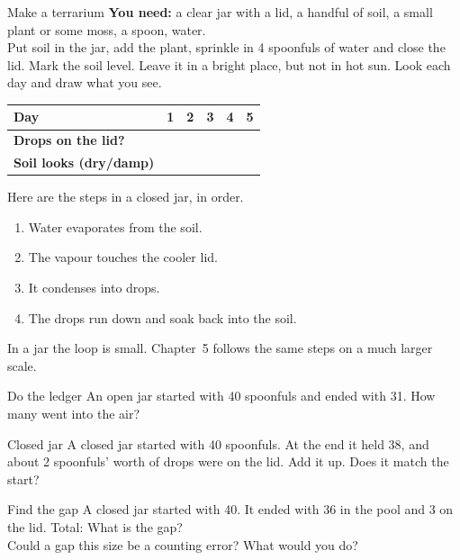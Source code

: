 \begin{tryit}{Make a terrarium}
\textbf{You need:} a clear jar with a lid, a handful of soil, a small plant or some moss, a spoon, water.\\
Put soil in the jar, add the plant, sprinkle in 4 spoonfuls of water and close the lid. Mark the soil level. Leave it in a bright place, but not in hot sun. Look each day and draw what you see.\par\medskip
\renewcommand{\arraystretch}{1.6}
\begin{tabular}{|l|c|c|c|c|c|}
\hline
\textbf{Day} & 1 & 2 & 3 & 4 & 5\\ \hline
\textbf{Drops on the lid?} & & & & & \\ \hline
\textbf{Soil looks (dry/damp)} & & & & & \\ \hline
\end{tabular}
\end{tryit}

Here are the steps in a closed jar, in order.
\begin{enumerate}[leftmargin=1.6em,itemsep=0.2em]
\item Water evaporates from the soil.
\item The vapour touches the cooler lid.
\item It condenses into drops.
\item The drops run down and soak back into the soil.
\end{enumerate}
In a jar the loop is small. Chapter~5 follows the same steps on a much larger scale.

\clearpage

\begin{puzzle}{Do the ledger}
An open jar started with 40 spoonfuls and ended with 31. How many went into the air? \wline[1.6cm]
\end{puzzle}

\begin{puzzle}{Closed jar}
A closed jar started with 40 spoonfuls. At the end it held 38, and about 2 spoonfuls' worth of drops were on the lid. Add it up. \wline[1.6cm] Does it match the start? \wline[2cm]
\end{puzzle}

\begin{puzzle}{Find the gap}
A closed jar started with 40. It ended with 36 in the pool and 3 on the lid. Total: \wline[1.6cm] What is the gap? \wline[1.6cm]\\
Could a gap this size be a counting error? \wline[2cm] What would you do? \wline[4cm]
\end{puzzle}

